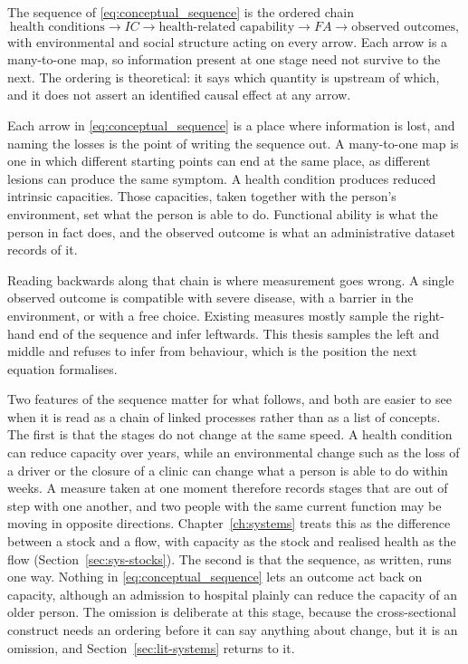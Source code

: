 \begin{definition}
\label{def:lit-sequence}
The sequence of \eqref{eq:conceptual_sequence} is the ordered chain
\[
  \text{health conditions}\rightarrow IC\rightarrow
  \text{health-related capability}\rightarrow FA\rightarrow
  \text{observed outcomes},
\]
with environmental and social structure acting on every arrow. Each arrow is a
many-to-one map, so information present at one stage need not survive to the
next. The ordering is theoretical: it says which quantity is upstream of which,
and it does not assert an identified causal effect at any arrow.
\end{definition}

Each arrow in \eqref{eq:conceptual_sequence} is a place where information is
lost, and naming the losses is the point of writing the sequence out. A many-to-one map is one in which different starting points can end at the same place, as different lesions can produce the same symptom. A health
condition produces reduced intrinsic capacities. Those capacities, taken
together with the person's environment, set what the person is able to do.
Functional ability is what the person in fact does, and the observed outcome
is what an administrative dataset records of it.

Reading backwards along that chain is where measurement goes wrong. A single
observed outcome is compatible with severe disease, with a barrier in the
environment, or with a free choice. Existing measures mostly sample
the right-hand end of the sequence and infer leftwards. This thesis samples the
left and middle and refuses to infer from behaviour, which is the position the
next equation formalises.

Two features of the sequence matter for what follows, and both are easier to see
when it is read as a chain of linked processes rather than as a list of
concepts. The first is that the stages do not change at the same speed. A
health condition can reduce capacity over years, while an environmental change
such as the loss of a driver or the closure of a clinic can change what a person
is able to do within weeks. A measure taken at one moment therefore records
stages that are out of step with one another, and two people with the same
current function may be moving in opposite directions. Chapter~\ref{ch:systems}
treats this as the difference between a stock and a flow, with capacity as the
stock and realised health as the flow (Section~\ref{sec:sys-stocks}). The
second is that the sequence, as written, runs one way. Nothing in
\eqref{eq:conceptual_sequence} lets an outcome act back on capacity, although
an admission to hospital plainly can reduce the capacity of an older person.
The omission is deliberate at this stage, because the cross-sectional
construct needs an ordering before it can say anything about change, but it is
an omission, and Section~\ref{sec:lit-systems} returns to it.

